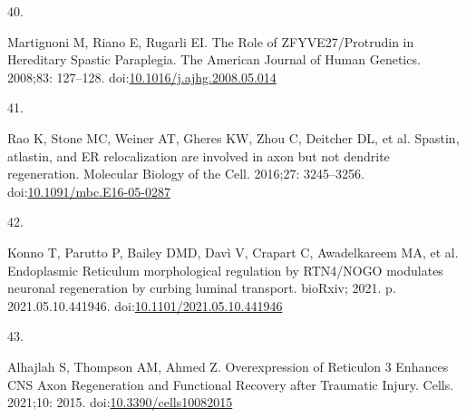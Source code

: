 \documentclass[
  12pt,
  a4paper,
]{article}
\newlength{\cslhangindent}
\newlength{\csllabelwidth}
\newlength{\cslentryspacingunit} %
\newenvironment{CSLReferences}[2] %
 {%
  \setlength{\parindent}{0pt}
  \ifodd #1
  \let\oldpar\par
  \def\par{\hangindent=\cslhangindent\oldpar}
  \fi
  \setlength{\parskip}{#2\cslentryspacingunit}
 }%
 {}
\newcommand{\CSLLeftMargin}[1]{\parbox[t]{\csllabelwidth}{#1}}
\newcommand{\CSLRightInline}[1]{\parbox[t]{\linewidth - \csllabelwidth}{#1}\break}
\begin{document}
\begin{CSLReferences}{0}{0}
\leavevmode{}%
\CSLLeftMargin{40. }%
\CSLRightInline{Martignoni M, Riano E, Rugarli EI. The {Role} of
{ZFYVE27}/{Protrudin} in {Hereditary Spastic Paraplegia}. The American
Journal of Human Genetics. 2008;83: 127--128.
doi:\href{https://doi.org/10.1016/j.ajhg.2008.05.014}{10.1016/j.ajhg.2008.05.014}}

\leavevmode{}%
\CSLLeftMargin{41. }%
\CSLRightInline{Rao K, Stone MC, Weiner AT, Gheres KW, Zhou C, Deitcher
DL, et al. Spastin, atlastin, and {ER} relocalization are involved in
axon but not dendrite regeneration. Molecular Biology of the Cell.
2016;27: 3245--3256.
doi:\href{https://doi.org/10.1091/mbc.E16-05-0287}{10.1091/mbc.E16-05-0287}}

\leavevmode{}%
\CSLLeftMargin{42. }%
\CSLRightInline{Konno T, Parutto P, Bailey DMD, Davì V, Crapart C,
Awadelkareem MA, et al. Endoplasmic {Reticulum} morphological regulation
by {RTN4}/{NOGO} modulates neuronal regeneration by curbing luminal
transport. {bioRxiv}; 2021. p. 2021.05.10.441946.
doi:\href{https://doi.org/10.1101/2021.05.10.441946}{10.1101/2021.05.10.441946}}

\leavevmode{}%
\CSLLeftMargin{43. }%
\CSLRightInline{Alhajlah S, Thompson AM, Ahmed Z. Overexpression of
{Reticulon} 3 {Enhances CNS Axon Regeneration} and {Functional Recovery}
after {Traumatic Injury}. Cells. 2021;10: 2015.
doi:\href{https://doi.org/10.3390/cells10082015}{10.3390/cells10082015}}

\end{CSLReferences}
\end{document}
